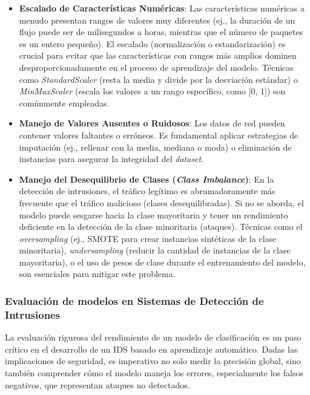 \begin{itemize}
     \item\textbf{Escalado de Características Numéricas}: Las características numéricas a menudo presentan rangos de valores muy diferentes (ej., la duración de un flujo puede ser de milisegundos a horas, mientras que el número de paquetes es un entero pequeño). El escalado (normalización o estandarización) es crucial para evitar que las características con rangos más amplios dominen desproporcionadamente en el proceso de aprendizaje del modelo. Técnicas como \textit{StandardScaler} (resta la media y divide por la desviación estándar) o \textit{MinMaxScaler} (escala los valores a un rango específico, como [0, 1]) son comúnmente empleadas.
    
     \item\textbf{Manejo de Valores Ausentes o Ruidosos}: Los datos de red pueden contener valores faltantes o erróneos. Es fundamental aplicar estrategias de imputación (ej., rellenar con la media, mediana o moda) o eliminación de instancias para asegurar la integridad del \textit{dataset}.
    
     \item\textbf{Manejo del Desequilibrio de Clases (\textit{Class Imbalance})}: En la detección de intrusiones, el tráfico legítimo es abrumadoramente más frecuente que el tráfico malicioso (clases desequilibradas). Si no se aborda, el modelo puede sesgarse hacia la clase mayoritaria y tener un rendimiento deficiente en la detección de la clase minoritaria (ataques). Técnicas como el \textit{oversampling} (ej., SMOTE para crear instancias sintéticas de la clase minoritaria), \textit{undersampling} (reducir la cantidad de instancias de la clase mayoritaria), o el uso de pesos de clase durante el entrenamiento del modelo, son esenciales para mitigar este problema.

\end{itemize}
\subsubsection{Evaluación de modelos en Sistemas de Detección de Intrusiones}

La evaluación rigurosa del rendimiento de un modelo de clasificación es un paso crítico en el desarrollo de un IDS basado en aprendizaje automático. Dadas las implicaciones de seguridad, es imperativo no solo medir la precisión global, sino también comprender cómo el modelo maneja los errores, especialmente los falsos negativos, que representan ataques no detectados.

